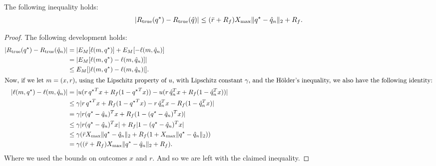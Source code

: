 \documentclass[11pt]{article}
\begin{document}
\begin{claim}
\label{claim1}
 The following inequality holds:
\begin{equation*}
  |R_{\mathrm{true}}({q^\star}) - R_{\mathrm{true}}(\hat q)| \leq (\bar r +R_f)X_{\max}\|{q^\star} - {\hat q}_n\|_2 + R_f.
\end{equation*}
\end{claim}

\begin{proof}
The following development holds:
\begin{align*}
  |R_{\mathrm{true}}({q^\star}) - R_{\mathrm{true}}({\hat q}_n)| &= |E_M[\ell(m,{q^\star})] + E_M[-\ell(m,{\hat q}_n)]\\
                                           & = |E_M[\ell(m,{q^\star}) - \ell(m,{\hat q}_n)]|\\
                                           & \leq E_M[|\ell(m,{q^\star}) - \ell(m,{\hat q}_n)|].\\
  \intertext{Now, if we let $m=(x,r)$, using the Lipschitz property of $u$, with Lipschitz constant 
  $\gamma$, and the Hölder's inequality, we also have the following identity:}
  |\ell(m,{q^\star}) - \ell(m,{\hat q}_n)| &= |u(r\,{q^\star}^Tx + R_f(1-{q^\star}^{T}x)) - u(r\,{\hat q}_n^Tx + R_f(1-{\hat q}_n^{T}x))| \\
                                           & \leq \gamma|r\,{q^\star}^Tx + R_f(1-{q^\star}^Tx) - r\,{\hat q}_n^Tx - R_f(1-{\hat q}_n^Tx)|\\
                                           & = \gamma|r({q^\star}-{\hat q}_n)^Tx + R_f(1-({q^\star}-{\hat q}_n)^Tx)|\\
                                           & \leq \gamma|r({q^\star}-{\hat q}_n)^Tx| + R_f|1-({q^\star}-{\hat q}_n)^Tx|\\
                                           & \leq \gamma(\bar rX_{\max} \|{q^\star}-{\hat q}_n\|_2 + R_f(1+X_{\max} \|{q^\star}-{\hat q}_n\|_2))\\
                                           & = \gamma((\bar r + R_f)X_{\max} \|{q^\star} - {\hat q}_n\|_2 + R_f).
\end{align*}
Where we used the bounds on outcomes $x$ and $r$. And so we are left with the claimed
inequality. 
\end{proof}
\end{document}
